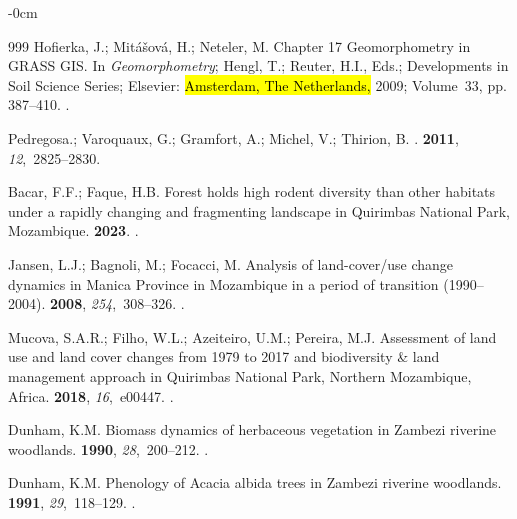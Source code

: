 \documentclass[coasts,article,accept,pdftex,oneauthor]{Definitions/mdpi}
\begin{document}
\begin{adjustwidth}{-\extralength}{0cm}
\begin{thebibliography}{999}
Hofierka, J.; Mitášová, H.; Neteler, M.
\newblock Chapter 17 Geomorphometry in GRASS GIS. In {\em Geomorphometry};
  Hengl, T.; Reuter, H.I., Eds.; Developments in
  Soil Science Series; Elsevier: \hl{Amsterdam, The Netherlands,}  2009; Volume~33, pp. 387--410.
.

Pedregosa.; Varoquaux, G.; Gramfort, A.; Michel, V.; Thirion, B.
.
 {\bf 2011}, {\em
  12},~2825--2830.

Bacar, F.F.; Faque, H.B.
\newblock Forest holds high rodent diversity than other habitats under a
  rapidly changing and fragmenting landscape in Quirimbas National Park,
  Mozambique.
 {\bf 2023}.
.

Jansen, L.J.; Bagnoli, M.; Focacci, M.
\newblock Analysis of land-cover/use change dynamics in Manica Province in
  Mozambique in a period of transition (1990–2004).
 {\bf 2008}, {\em 254},~308--326.
.

Mucova, S.A.R.; Filho, W.L.; Azeiteiro, U.M.; Pereira, M.J.
\newblock Assessment of land use and land cover changes from 1979 to 2017 and
  biodiversity \& land management approach in Quirimbas National Park, Northern
  Mozambique, Africa.
 {\bf 2018}, {\em 16},~e00447.
.

Dunham, K.M.
\newblock Biomass dynamics of herbaceous vegetation in Zambezi riverine
  woodlands.
 {\bf 1990}, {\em 28},~200--212.
.

Dunham, K.M.
\newblock Phenology of Acacia albida trees in Zambezi riverine woodlands.
 {\bf 1991}, {\em 29},~118--129.
.


\end{thebibliography}
\end{adjustwidth}
\end{document}
